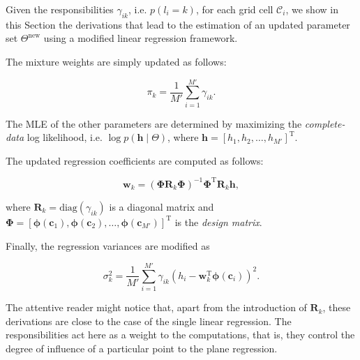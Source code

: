 Given the responsibilities $\gamma_{ik}$, i.e. $p(l_i=k)$, for each grid cell
$\mathcal{C}_i$, we show in this Section the derivations that lead to the
estimation of an updated parameter set $\Theta^\text{new}$ using a modified
linear regression framework.

The mixture weights are simply updated as follows:

\begin{equation}
\label{eqn:weights}
\pi_k = \frac{1}{M'}\sum_{i=1}^{M'}\gamma_{ik}.
\end{equation}

The MLE of the other parameters are determined by maximizing the
\emph{complete-data} log likelihood, i.e. $\log p(\mathbf{h}\mid\Theta)$, where
$\mathbf{h}=[h_1,h_2,\dots,h_{M'}]^\text{T}$.

The updated regression coefficients are computed as follows:

\begin{equation}
\label{eqn:coeff}
\mathbf{w}_k = (\boldsymbol{\Phi}\mathbf{R}_k\boldsymbol{\Phi})^{-1}
\boldsymbol{\Phi}^\text{T}\mathbf{R}_k\mathbf{h},
\end{equation}

where $\mathbf{R}_k=\text{diag}(\gamma_{ik})$ is a diagonal matrix and
$\boldsymbol{\Phi}=[\boldsymbol{\phi}(\mathbf{c}_1), \boldsymbol{\phi}
(\mathbf{c}_2),\dots,\boldsymbol{\phi}(\mathbf{c}_{M'})]^\text{T}$ is the
\emph{design matrix}.

Finally, the regression variances are modified as

\begin{equation}
\label{eqn:coeff}
\sigma^2_k = \frac{1}{M'}\sum_{i=1}^{M'} \gamma_{ik}(h_i-\mathbf{w}_k^\text{T}
\boldsymbol{\phi}(\mathbf{c}_i))^2.
\end{equation}

The attentive reader might notice that, apart from the introduction of
$\mathbf{R}_k$, these derivations are close to the case of the single linear
regression. The responsibilities act here as a weight to the computations, that
is, they control the degree of influence of a particular point to the
plane regression.
